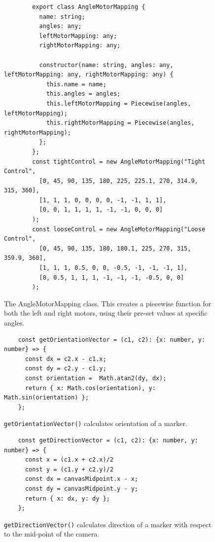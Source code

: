\documentclass{l4proj}
\begin{document}
\begin{appendices}
\begin{figure}[!h]
\begin{lstlisting}
        export class AngleMotorMapping {
          name: string;
          angles: any;
          leftMotorMapping: any;
          rightMotorMapping: any;
        
          constructor(name: string, angles: any, leftMotorMapping: any, rightMotorMapping: any) {
            this.name = name;
            this.angles = angles;
            this.leftMotorMapping = Piecewise(angles, leftMotorMapping);
            this.rightMotorMapping = Piecewise(angles, rightMotorMapping);
          };
        };
        const tightControl = new AngleMotorMapping("Tight Control",
          [0, 45, 90, 135, 180, 225, 225.1, 270, 314.9, 315, 360],
          [1, 1, 1, 0, 0, 0, 0, -1, -1, 1, 1],
          [0, 0, 1, 1, 1, 1, -1, -1, 0, 0, 0]
        );
        const looseControl = new AngleMotorMapping("Loose Control",
          [0, 45, 90, 135, 180, 180.1, 225, 270, 315, 359.9, 360],
          [1, 1, 1, 0.5, 0, 0, -0.5, -1, -1, -1, 1],
          [0, 0.5, 1, 1, 1, -1, -1, -1, -0.5, 0, 0]
        );
        \end{lstlisting}
    \caption{The AngleMotorMapping class. This creates a piecewise function for both the left and right motors, using their pre-set values at specific angles.}
    \label{lst:angleMotorMappings}
\end{figure}

\begin{figure}[!h]
    \begin{lstlisting}
    const getOrientationVector = (c1, c2): {x: number, y: number} => {
      const dx = c2.x - c1.x;
      const dy = c2.y - c1.y;
      const orientation =  Math.atan2(dy, dx);
      return { x: Math.cos(orientation), y: Math.sin(orientation) };
    };
    \end{lstlisting}
\caption{\lstinline{getOrientationVector()} calculates orientation of a marker.}
\label{lst:orientation-code}
\end{figure}

\begin{figure}[!h]
    \begin{lstlisting}
    const getDirectionVector = (c1, c2): {x: number, y: number} => {
      const x = (c1.x + c2.x)/2
      const y = (c1.y + c2.y)/2
      const dx = canvasMidpoint.x - x;
      const dy = canvasMidpoint.y - y;
      return { x: dx, y: dy };
    };
    \end{lstlisting}
\caption{\lstinline{getDirectionVector()} calculates direction of a marker with respect to the mid-point of the camera.}
\label{lst:direction-code}
\end{figure}


\end{appendices}
\end{document}
